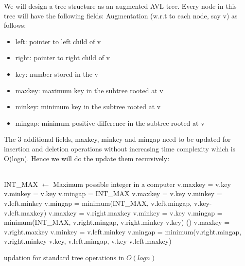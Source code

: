 \documentclass[a4 paper]{article}
\begin{document}

We will design a tree structure as an augmented AVL tree. Every node in this tree will have the following fields:
Augmentation (w.r.t to each node, say v) as follows:
\begin{itemize}
  \item[\textendash] left: pointer to left child of v
  \item[\textendash] right: pointer to right child of v
  \item[\textendash] key: number stored in the v
  \item[\textendash] maxkey: maximum key in the subtree rooted at v
  \item[\textendash] minkey: minimum key in the subtree rooted at v
  \item[\textendash] mingap: minimum positive difference in the subtree rooted at v
\end{itemize}
The 3 additional fields, maxkey, minkey and mingap need to be updated for insertion and deletion operations without increasing time complexity which is O(logn). Hence we will do the update them recursively: \\\\
\begin{algorithm}[H]
\SetAlgoLined
{}
INT\_MAX $\leftarrow $ {Maximum possible integer in a computer}\;
{   
    v.maxkey = v.key\;
    v.minkey = v.key\;
    v.mingap = INT\_MAX\;
}
{
    v.maxkey = v.key\;
    v.minkey = v.left.minkey\;
    v.mingap = minimum(INT\_MAX, v.left.mingap, v.key-v.left.maxkey)\;
}
{
    v.maxkey = v.right.maxkey\;
    v.minkey = v.key\;
    v.mingap = minimum(INT\_MAX, v.right.mingap, v.right.minkey-v.key)\;
}
\Else()
{
    v.maxkey = v.right.maxkey\;
    v.minkey = v.left.minkey\;
    v.mingap = minimum(v.right.mingap, v.right.minkey-v.key, v.left.mingap, v.key-v.left.maxkey)\;
}
\caption{updation for standard tree operations in $O(logn)$}
\end{algorithm}
\vspace{4mm}
\newpage
{}
\end{document}
